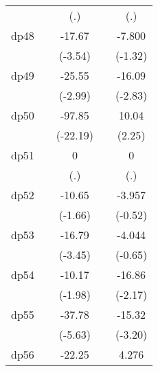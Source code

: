 {\begin{tabular}{l*{4}{c}}
            &                     &         (.)         &                     &         (.)         \\
[1em]
dp48        &                     &      -17.67\sym{***}&                     &      -7.800         \\
            &                     &     (-3.54)         &                     &     (-1.32)         \\
[1em]
dp49        &                     &      -25.55\sym{**} &                     &      -16.09\sym{**} \\
            &                     &     (-2.99)         &                     &     (-2.83)         \\
[1em]
dp50        &                     &      -97.85\sym{***}&                     &       10.04\sym{*}  \\
            &                     &    (-22.19)         &                     &      (2.25)         \\
[1em]
dp51        &                     &           0         &                     &           0         \\
            &                     &         (.)         &                     &         (.)         \\
[1em]
dp52        &                     &      -10.65         &                     &      -3.957         \\
            &                     &     (-1.66)         &                     &     (-0.52)         \\
[1em]
dp53        &                     &      -16.79\sym{***}&                     &      -4.044         \\
            &                     &     (-3.45)         &                     &     (-0.65)         \\
[1em]
dp54        &                     &      -10.17\sym{*}  &                     &      -16.86\sym{*}  \\
            &                     &     (-1.98)         &                     &     (-2.17)         \\
[1em]
dp55        &                     &      -37.78\sym{***}&                     &      -15.32\sym{**} \\
            &                     &     (-5.63)         &                     &     (-3.20)         \\
[1em]
dp56        &                     &      -22.25\sym{**} &                     &       4.276         \\

\end{tabular}}
